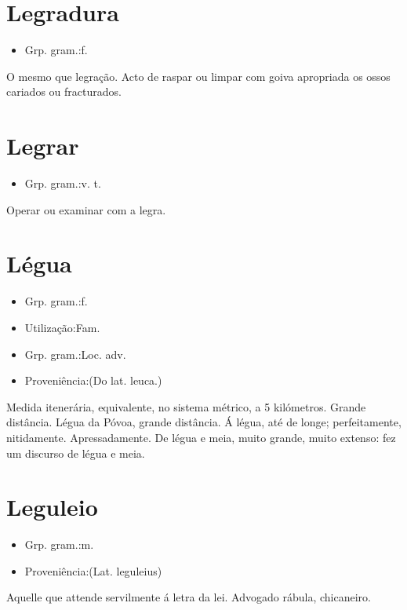 \section{Legradura}
\begin{itemize}
\item {Grp. gram.:f.}
\end{itemize}
O mesmo que \textunderscore legração\textunderscore .
Acto de raspar ou limpar com goiva apropriada os ossos cariados ou fracturados.
\section{Legrar}
\begin{itemize}
\item {Grp. gram.:v. t.}
\end{itemize}
Operar ou examinar com a legra.
\section{Légua}
\begin{itemize}
\item {Grp. gram.:f.}
\end{itemize}
\begin{itemize}
\item {Utilização:Fam.}
\end{itemize}
\begin{itemize}
\item {Grp. gram.:Loc. adv.}
\end{itemize}
\begin{itemize}
\item {Proveniência:(Do lat. \textunderscore leuca\textunderscore .)}
\end{itemize}
Medida itenerária, equivalente, no sistema métrico, a 5 kilómetros.
Grande distância.
\textunderscore Légua da Póvoa\textunderscore , grande distância.
\textunderscore Á légua\textunderscore , até de longe; perfeitamente, nitidamente.
Apressadamente.
\textunderscore De légua e meia\textunderscore , muito grande, muito extenso: \textunderscore fez um discurso de légua e meia\textunderscore .
\section{Leguleio}
\begin{itemize}
\item {Grp. gram.:m.}
\end{itemize}
\begin{itemize}
\item {Proveniência:(Lat. \textunderscore leguleius\textunderscore )}
\end{itemize}
Aquelle que attende servilmente á letra da lei.
Advogado rábula, chicaneiro.
